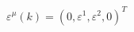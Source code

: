 \begin{equation}
\varepsilon^{\mu}(k) =
(0, \varepsilon^1, \varepsilon^2, 0)^T
\label{13}
\end{equation}

